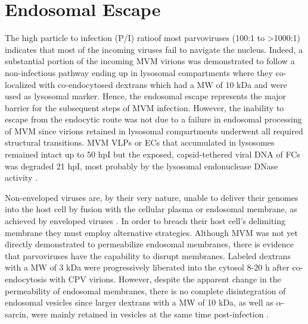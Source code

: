  

\section{Endosomal Escape}
\label{Escape}
The high particle to infection (P/I) ratio\footnotemark of most parvoviruses (100:1 to >1000:1) \cite{pmid4673484, pmid20649475, pmid7288919} indicates that most of the incoming viruses fail to navigate the nucleus. Indeed, a substantial portion of the incoming MVM virions was demonstrated to follow a non-infectious pathway ending up in lysosomal compartments where they co-localized with co-endocytosed dextrans which had a MW of 10 kDa and were used as lysosomal marker. Hence, the endosomal escape represents the major barrier for the subsequent steps of MVM infection. However, the inability to escape from the endocytic route was not due to a failure in endosomal processing of MVM since virions retained in lysosomal compartments underwent all required structural transitions. MVM VLPs or ECs that accumulated in lysosomes remained intact up to 50 hpI but the exposed, capsid-tethered viral DNA of FCs was degraded 21 hpI, most probably by the lysosomal endonuclease DNase~ activity \cite{pmid16379002}. 

Non-enveloped viruses are, by their very nature, unable to deliver their genomes into the host cell by fusion with the cellular plasma or endosomal membrane, as achieved by enveloped viruses \cite{pmid18596815}. In order to breach their host cell's delimiting membrane they must employ alternative strategies. Although MVM was not yet directly demonstrated to permeabilize endosomal membranes, there is evidence that parvoviruses have the capability to disrupt membranes. Labeled dextrans with a MW of 3 kDa were progressively liberated into the cytosol 8-20 h after co-endocytosis with CPV virions. However, despite the apparent change in the permeability of endosomal membranes, there is no complete disintegration of endosomal vesicles since larger dextrans with a MW of 10 kDa, as well as $\alpha$-sarcin, were mainly retained in vesicles at the same time post-infection \cite{pmid14644609, pmid10644365}.


